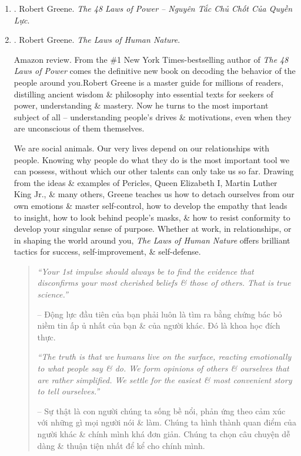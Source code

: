 \documentclass{article}
\begin{document}
\begin{enumerate}
	\item \cite{Greene_laws_power_VN}. {\sc Robert Greene}. {\it The 48 Laws of Power -- Nguyên Tắc Chủ Chốt Của Quyền Lực}.\hfill{\sf[done]}
	
	\item \cite{Greene_laws_human_nature}. {\sc Robert Greene}. {\it The Laws of Human Nature}. {}
	
	{\sf Amazon review.} From the \#1 New York Times-bestselling author of {\it The 48 Laws of Power} comes the definitive new book on decoding the behavior of the people around you.{\sc Robert Greene} is a master guide for millions of readers, distilling ancient wisdom \& philosophy into essential texts for seekers of power, understanding \& mastery. Now he turns to the most important subject of all -- understanding people's drives \& motivations, even when they are unconscious of them themselves.
	
	We are social animals. Our very lives depend on our relationships with people. Knowing why people do what they do is the most important tool we can possess, without which our other talents can only take us so far. Drawing from the ideas \& examples of {\sc Pericles, Queen Elizabeth I, Martin Luther King Jr.}, \& many others, {\sc Greene} teaches us how to detach ourselves from our own emotions \& master self-control, how to develop the empathy that leads to insight, how to look behind people's masks, \& how to resist conformity to develop your singular sense of purpose. Whether at work, in relationships, or in shaping the world around you, {\it The Laws of Human Nature} offers brilliant tactics for success, self-improvement, \& self-defense.
	\begin{quotation}
		{\it``Your 1st impulse should always be to find the evidence that disconfirms your most cherished beliefs \& those of others. That is true science.''}
		
		-- Động lực đầu tiên của bạn phải luôn là tìm ra bằng chứng bác bỏ niềm tin ấp ủ nhất của bạn \& của người khác. Đó là khoa học đích thực.
		
		{\it``The truth is that we humans live on the surface, reacting emotionally to what people say \& do. We form opinions of others \& ourselves that are rather simplified. We settle for the easiest \& most convenient story to tell ourselves.''}
		
		-- Sự thật là con người chúng ta sống bề nổi, phản ứng theo cảm xúc với những gì mọi người nói \& làm. Chúng ta hình thành quan điểm của người khác \& chính mình khá đơn giản. Chúng ta chọn câu chuyện dễ dàng \& thuận tiện nhất để kể cho chính mình.
		

\end{quotation}
\end{enumerate}
\end{document}
